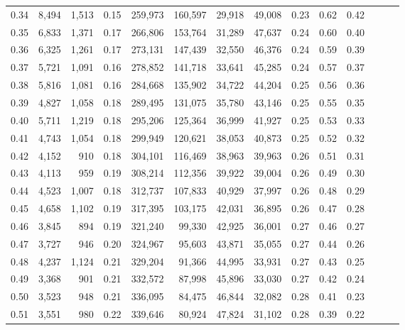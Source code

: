 \begin{tabular}{rrrrrrrrrrrrrr}
0.34 &   8,494 &  1,513 &  0.15 &  259,973 &  160,597 &  29,918 &  49,008 &  0.23 &  0.62 &      0.42 \\
0.35 &   6,833 &  1,371 &  0.17 &  266,806 &  153,764 &  31,289 &  47,637 &  0.24 &  0.60 &      0.40 \\
0.36 &   6,325 &  1,261 &  0.17 &  273,131 &  147,439 &  32,550 &  46,376 &  0.24 &  0.59 &      0.39 \\
0.37 &   5,721 &  1,091 &  0.16 &  278,852 &  141,718 &  33,641 &  45,285 &  0.24 &  0.57 &      0.37 \\
0.38 &   5,816 &  1,081 &  0.16 &  284,668 &  135,902 &  34,722 &  44,204 &  0.25 &  0.56 &      0.36 \\
0.39 &   4,827 &  1,058 &  0.18 &  289,495 &  131,075 &  35,780 &  43,146 &  0.25 &  0.55 &      0.35 \\
0.40 &   5,711 &  1,219 &  0.18 &  295,206 &  125,364 &  36,999 &  41,927 &  0.25 &  0.53 &      0.33 \\
0.41 &   4,743 &  1,054 &  0.18 &  299,949 &  120,621 &  38,053 &  40,873 &  0.25 &  0.52 &      0.32 \\
0.42 &   4,152 &    910 &  0.18 &  304,101 &  116,469 &  38,963 &  39,963 &  0.26 &  0.51 &      0.31 \\
0.43 &   4,113 &    959 &  0.19 &  308,214 &  112,356 &  39,922 &  39,004 &  0.26 &  0.49 &      0.30 \\
0.44 &   4,523 &  1,007 &  0.18 &  312,737 &  107,833 &  40,929 &  37,997 &  0.26 &  0.48 &      0.29 \\
0.45 &   4,658 &  1,102 &  0.19 &  317,395 &  103,175 &  42,031 &  36,895 &  0.26 &  0.47 &      0.28 \\
0.46 &   3,845 &    894 &  0.19 &  321,240 &   99,330 &  42,925 &  36,001 &  0.27 &  0.46 &      0.27 \\
0.47 &   3,727 &    946 &  0.20 &  324,967 &   95,603 &  43,871 &  35,055 &  0.27 &  0.44 &      0.26 \\
0.48 &   4,237 &  1,124 &  0.21 &  329,204 &   91,366 &  44,995 &  33,931 &  0.27 &  0.43 &      0.25 \\
0.49 &   3,368 &    901 &  0.21 &  332,572 &   87,998 &  45,896 &  33,030 &  0.27 &  0.42 &      0.24 \\
0.50 &   3,523 &    948 &  0.21 &  336,095 &   84,475 &  46,844 &  32,082 &  0.28 &  0.41 &      0.23 \\
0.51 &   3,551 &    980 &  0.22 &  339,646 &   80,924 &  47,824 &  31,102 &  0.28 &  0.39 &      0.22 \\

\end{tabular}
